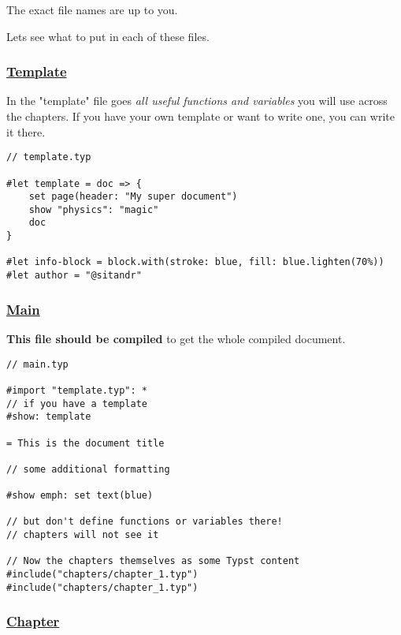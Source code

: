 \pandocbounded{}

The exact file names are up to you.

Let\textquotesingle s see what to put in each of these files.

\subsubsection{\texorpdfstring{\hyperref[template]{Template}}{Template}}\label{template}

In the "template" file goes \emph{all useful functions and variables}
you will use across the chapters. If you have your own template or want
to write one, you can write it there.

\begin{verbatim}
// template.typ

#let template = doc => {
    set page(header: "My super document")
    show "physics": "magic"
    doc
}

#let info-block = block.with(stroke: blue, fill: blue.lighten(70%))
#let author = "@sitandr"
\end{verbatim}

\subsubsection{\texorpdfstring{\hyperref[main]{Main}}{Main}}\label{main}

\textbf{This file should be compiled} to get the whole compiled
document.

\begin{verbatim}
// main.typ

#import "template.typ": *
// if you have a template
#show: template

= This is the document title

// some additional formatting

#show emph: set text(blue)

// but don't define functions or variables there!
// chapters will not see it

// Now the chapters themselves as some Typst content
#include("chapters/chapter_1.typ")
#include("chapters/chapter_1.typ")
\end{verbatim}

\subsubsection{\texorpdfstring{\hyperref[chapter]{Chapter}}{Chapter}}\label{chapter}


